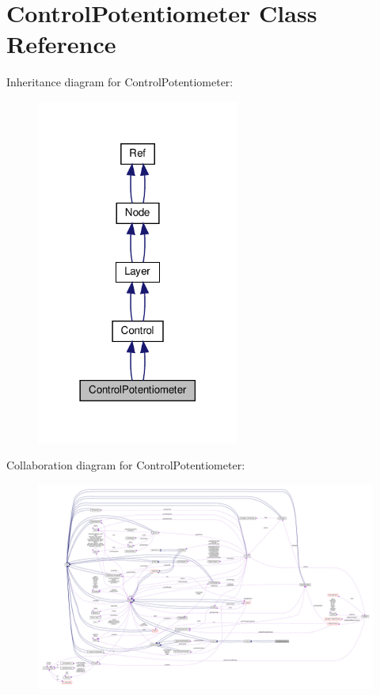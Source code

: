 \hypertarget{classControlPotentiometer}{}\section{Control\+Potentiometer Class Reference}
\label{classControlPotentiometer}


Inheritance diagram for Control\+Potentiometer\+:
\nopagebreak
\begin{figure}[H]
\begin{center}
\leavevmode
\includegraphics[width=189pt]{classControlPotentiometer__inherit__graph}
\end{center}
\end{figure}


Collaboration diagram for Control\+Potentiometer\+:
\nopagebreak
\begin{figure}[H]
\begin{center}
\leavevmode
\includegraphics[width=350pt]{classControlPotentiometer__coll__graph}
\end{center}
\end{figure}
